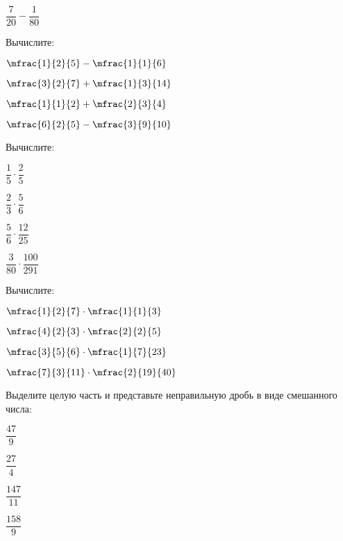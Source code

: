 \begin{listofex}
\begin{enumcols}[itemcolumns=6]
		\item \( \dfrac{7}{20}-\dfrac{1}{80} \)
	\end{enumcols}
	\item Вычислите:
		\begin{enumcols}[itemcolumns=4]
		\item \( \mfrac{1}{2}{5}-\mfrac{1}{1}{6} \)
		\item \( \mfrac{3}{2}{7}+\mfrac{1}{3}{14} \)
		\item \( \mfrac{1}{1}{2}+\mfrac{2}{3}{4} \)
		\item \( \mfrac{6}{2}{5}-\mfrac{3}{9}{10} \)	
	\end{enumcols}
	\item Вычислите:
		\begin{enumcols}[itemcolumns=4]
		\item \( \dfrac{1}{5}\cdot\dfrac{2}{5} \)
		\item \( \dfrac{2}{3}\cdot\dfrac{5}{6} \)
		\item \( \dfrac{5}{6}\cdot\dfrac{12}{25} \)
		\item \( \dfrac{3}{80}\cdot\dfrac{100}{291} \)
	\end{enumcols}
	\item Вычислите:
		\begin{enumcols}[itemcolumns=4]
		\item \( \mfrac{1}{2}{7}\cdot\mfrac{1}{1}{3} \)
		\item \( \mfrac{4}{2}{3}\cdot\mfrac{2}{2}{5} \)
		\item \( \mfrac{3}{5}{6}\cdot\mfrac{1}{7}{23} \)
		\item \( \mfrac{7}{3}{11}\cdot\mfrac{2}{19}{40} \)
	\end{enumcols}
	\item Выделите целую часть и представьте неправильную дробь в виде смешанного числа:
		\begin{enumcols}[itemcolumns=4]
		\item \( \dfrac{47}{9} \)
		\item \( \dfrac{27}{4} \)
		\item \( \dfrac{147}{11} \)
		\item \( \dfrac{158}{9} \)
	\end{enumcols}
\end{listofex}
%	

